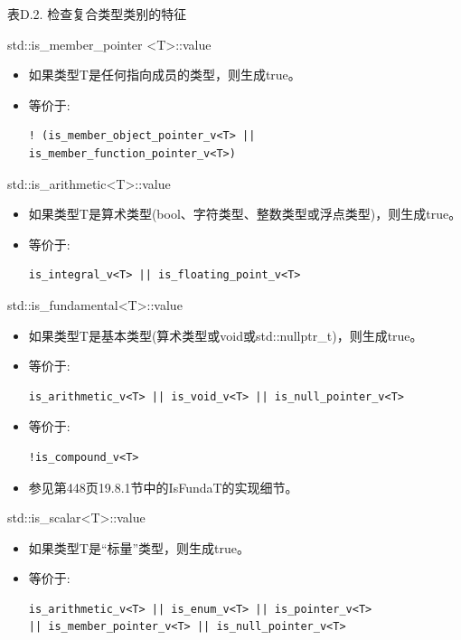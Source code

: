 \begin{center}
表D.2. 检查复合类型类别的特征
\end{center}

std::is\_member\_pointer <T>::value

\begin{itemize}
\item 
如果类型T是任何指向成员的类型，则生成true。

\item 
等价于: 
\begin{lstlisting}[style=styleCXX]
! (is_member_object_pointer_v<T> || is_member_function_pointer_v<T>)
\end{lstlisting}
\end{itemize}

std::is\_arithmetic<T>::value

\begin{itemize}
\item 
如果类型T是算术类型(bool、字符类型、整数类型或浮点类型)，则生成true。

\item 
等价于: 
\begin{lstlisting}[style=styleCXX]
is_integral_v<T> || is_floating_point_v<T>
\end{lstlisting}
\end{itemize}

std::is\_fundamental<T>::value

\begin{itemize}
\item 
如果类型T是基本类型(算术类型或void或std::nullptr\_t)，则生成true。

\item 
等价于: 
\begin{lstlisting}[style=styleCXX]
is_arithmetic_v<T> || is_void_v<T> || is_null_pointer_v<T>
\end{lstlisting}

\item 
等价于: 
\begin{lstlisting}[style=styleCXX]
!is_compound_v<T>
\end{lstlisting}

\item 
参见第448页19.8.1节中的IsFundaT的实现细节。
\end{itemize}


std::is\_scalar<T>::value

\begin{itemize}
\item 
如果类型T是“标量”类型，则生成true。

\item 
等价于:  
\begin{lstlisting}[style=styleCXX]
is_arithmetic_v<T> || is_enum_v<T> || is_pointer_v<T>
|| is_member_pointer_v<T> || is_null_pointer_v<T>
\end{lstlisting}
\end{itemize}

